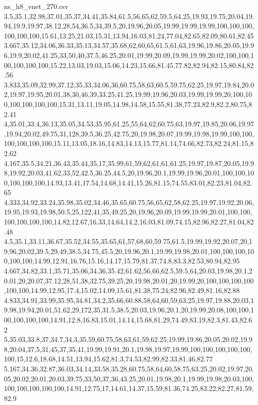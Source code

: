 \begin{filecontents*}[overwrite]{ns_h8_enet_270.csv}
3.5,35.1,32.98,37.01,35.37,34.41,35.84,61.5,56,65,62,59.5,64.25,19.93,19.75,20.04,19.94,19.9,19.97,38.12,28,54,36.5,34,39.5,20,19.96,20.05,19.99,19.99,19.99,100,100,100,100,100,100,15.61,13.25,21.03,15.31,13.94,16.03,81.24,77.04,82.65,82.09,80.61,82.45
3.667,35.12,34.06,36.33,35.13,34.57,35.68,62,60,65,61.5,61,63,19.96,19.86,20.05,19.96,19.9,20.02,41.25,33,50,40,37.5,46.25,20.01,19.99,20.09,19.99,19.99,20.02,100,100,100,100,100,100,15.22,13.03,19.03,15.06,14.23,15.66,81.45,77.82,82.94,82.15,80.84,82.56
3.833,35.09,32.99,37.12,35.33,34.06,36,60.75,58,63,60.5,59.75,62.25,19.97,19.84,20.02,19.97,19.95,20.01,38,30,46,39,33.25,41.25,19.99,19.96,20.03,19.99,19.99,20,100,100,100,100,100,100,15.31,13.11,19.05,14.98,14.58,15.55,81.38,77.23,82.9,82.2,80.75,82.41
4,35.01,33.4,36.13,35.05,34.53,35.95,61.25,55,64,62,60.75,63,19.97,19.85,20.06,19.97,19.94,20.02,49.75,31,128,39.5,36.25,42.75,20,19.98,20.07,19.99,19.98,19.99,100,100,100,100,100,100,15.11,13.05,18.16,14.83,14.13,15.77,81.14,74.66,82.73,82.24,81.15,82.62
4.167,35.5,34.21,36.43,35.44,35.17,35.99,61,59,62,61,61,61.25,19.97,19.87,20.05,19.98,19.92,20.03,41.62,33,52,42.5,36.25,44.5,20,19.96,20.1,19.99,19.96,20.01,100,100,100,100,100,100,14.93,13.41,17.54,14.68,14.41,15.26,81.15,74.55,83.01,82.23,81.04,82.65
4.333,34.92,33.24,35.98,35.02,34.46,35.65,60.75,56,65,62,58,62.25,19.97,19.92,20.06,19.95,19.93,19.98,50.5,25,122,41,35,49.25,20,19.96,20.09,19.99,19.99,20.01,100,100,100,100,100,100,14.82,12.67,16.33,14.64,14.2,16.03,81.09,74.15,82.96,82.27,81.04,82.48
4.5,35.1,33.11,36.67,35.52,34.55,35.65,61,57,68,60,59.75,61.5,19.99,19.92,20.07,20,19.96,20.02,39.5,29,49,38.5,34.75,45.5,20,19.96,20.1,19.99,19.98,20.01,100,100,100,100,100,100,14.99,12.91,16.76,15.16,14.17,15.79,81.37,74.8,83.3,82.53,80.94,82.95
4.667,34.82,33.1,35.71,35.06,34.36,35.42,61.62,56,66,62.5,59.5,64,20.03,19.98,20.1,20.01,20,20.07,37.12,28,51,38,32.75,39.25,20,19.98,20.01,20,19.99,20,100,100,100,100,100,100,14.99,12.95,17.4,15.02,14.09,15.61,81.38,75.24,82.96,82.49,81.16,82.88
4.833,34.91,33.99,35.95,34.81,34.2,35.66,60.88,58,64,60,59,63.25,19.97,19.88,20.03,19.98,19.94,20.01,51.62,29,172,35,31.5,38.5,20.03,19.96,20.1,20,19.99,20.08,100,100,100,100,100,100,14.91,12.8,16.83,15.01,14.14,15.68,81.29,74.49,83.19,82.3,81.43,82.62
5,35.03,33.8,37,34.7,34.3,35.59,60.75,58,63,61,59,62.25,19.99,19.86,20.05,20.02,19.98,20.04,37.5,31,45,37,35,41,19.99,19.91,20.1,19.98,19.97,19.99,100,100,100,100,100,100,15,12.6,18.68,14.51,13.94,15.62,81.3,74.53,82.99,82.33,81.46,82.77
5.167,34.36,32.87,36.03,34.14,33.58,35.28,60.75,58,64,60,58.75,63.25,20.02,19.97,20.05,20.02,20.01,20.03,39.75,33,50,37,36,43.25,20.01,19.98,20.1,19.99,19.98,20.03,100,100,100,100,100,100,14.91,12.75,17,14.61,14.37,15.59,81.36,74.25,83.22,82.27,81.59,82.9

\end{filecontents*}
